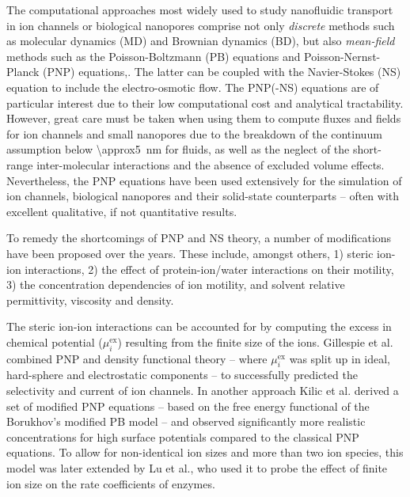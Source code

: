 \documentclass[journal=ancac3,manuscript=article,etalmode=truncate,maxauthors=0,layout=twocolumn]{achemso}
\begin{document}
The computational approaches most widely used to study nanofluidic transport in ion channels or biological
nanopores comprise not only \emph{discrete} methods such as molecular dynamics (MD)\cite{Lynden-Bell-1996,
Allen-1999,Aksimentiev-2005,Luan-2008,Bhattacharya-2011,Zhang-2014,DiMarino-2015,Belkin-2016} and Brownian
dynamics (BD),\cite{Schirmer-1999,Im-2002,Noskov-2004,Millar-2008,Egwolf-2010,DeBiase-2015,Pederson-2015} but
also \emph{mean-field} methods such as the Poisson-Boltzmann (PB) equations\cite{Grochowski-2008,
Baldessari-2008-1} and Poisson-Nernst-Planck (PNP) equations,\cite{Eisenberg-1996,Gillespie-2002,
Simakov-2010}. The latter can be coupled with the Navier-Stokes (NS) equation to include the electro-osmotic
flow.\cite{Lu-2012,Pederson-2015} The PNP(-NS) equations are of particular interest due to their low
computational cost and  analytical tractability. However, great care must be taken when using them to compute
fluxes and fields for ion channels and small nanopores due to the breakdown of the continuum assumption below
\SI{\approx5}{\nm} for fluids, as well as the neglect of the short-range inter-molecular interactions and the
absence of excluded volume effects.\cite{Corry-2000,Collins-2012} Nevertheless, the PNP equations have been
used extensively for the simulation of ion channels,\cite{Im-2002,Furini-2006,Liu-2015} biological
nanopores\cite{Simakov-2010,Pederson-2015,Aguilella-Arzo-2017,Simakov-2018} and their solid-state
counterparts\cite{Cervera-2005,White-2008,Chaudhry-2014,Laohakunakorn-2015} -- often with excellent
qualitative, if not quantitative results.\cite{Maffeo-2012,Thomas-2014,Kim-2015}

To remedy the shortcomings of PNP and NS theory, a number of modifications have been proposed over the years.
These include, amongst others, 1) steric ion-ion interactions, 2) the effect of protein-ion/water interactions
on their motility, 3) the concentration dependencies of ion motility, and solvent relative permittivity,
viscosity and density.

The steric ion-ion interactions can be accounted for by computing the excess in chemical potential
($\mu_{i}^\text{ex}$) resulting from the finite size of the ions.\cite{Eisenberg-1996,Bazant-2009,
Daiguji-2010} Gillespie et al. combined PNP and density functional theory -- where $\mu_{i}^\text{ex}$ was
split up in ideal, hard-sphere and electrostatic components -- to successfully predicted the selectivity and
current of ion channels.\cite{Gillespie-2002} In another approach Kilic et al. derived a set of modified PNP
equations -- based on the free energy functional of the Borukhov's modified PB model\cite{Borukhov-1997} --
and observed significantly more realistic concentrations for high surface potentials compared to the classical
PNP equations.\cite{Kilic-2007} To allow for non-identical ion sizes and more than two ion species, this model
was later extended by Lu et al., who used it to probe the effect of finite ion size on the rate coefficients
of enzymes.\cite{Lu-2011}
\end{document}
